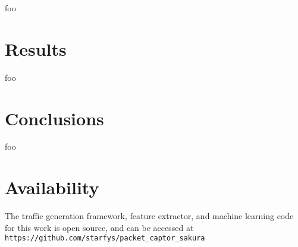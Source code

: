 foo
\section{Results}
foo

\section{Conclusions}
foo
\section{Availability}

The traffic generation framework, feature extractor, and machine learning code for this work is open source, and can be accessed at \texttt{https://github.com/starfys/packet\_captor\_sakura}
% 
% 



